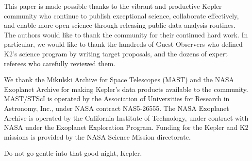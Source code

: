 \documentclass[modern]{aastex62}
\begin{document}
This paper is made possible thanks to the vibrant and productive Kepler community who continue to publish exceptional science, collaborate effectively, and enable more open science through releasing public data analysis routines. The authors would like to thank the community for their continued hard work. In particular, we would like to thank the hundreds of Guest Observers who defined K2's science program by writing target proposals, and the dozens of expert referees who carefully reviewed them.

We thank the Mikulski Archive for Space Telescopes (MAST) and the NASA Exoplanet Archive for making Kepler's data products available to the community. MAST/STScI is operated by the Association of Universities for Research in Astronomy, Inc., under NASA contract NAS5-26555. The NASA Exoplanet Archive is operated by the California Institute of Technology, under contract with NASA under the Exoplanet Exploration Program.
Funding for the Kepler and K2 missions is provided by the NASA Science Mission directorate.

Do not go gentle into that good night, Kepler.
\\
\end{document}
